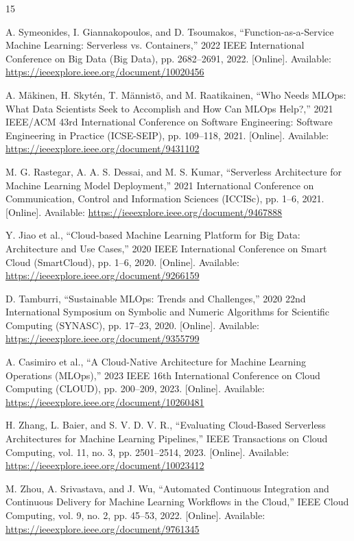 \documentclass[conference]{IEEEtran}
\begin{document}
\begin{thebibliography}{15}

A. Symeonides, I. Giannakopoulos, and D. Tsoumakos, ``Function-as-a-Service Machine Learning: Serverless vs. Containers,'' 2022 IEEE International Conference on Big Data (Big Data), pp. 2682--2691, 2022. [Online]. Available: \url{https://ieeexplore.ieee.org/document/10020456}

A. M\"akinen, H. Skyt\'en, T. M\"annist\"o, and M. Raatikainen, ``Who Needs MLOps: What Data Scientists Seek to Accomplish and How Can MLOps Help?,'' 2021 IEEE/ACM 43rd International Conference on Software Engineering: Software Engineering in Practice (ICSE-SEIP), pp. 109--118, 2021. [Online]. Available: \url{https://ieeexplore.ieee.org/document/9431102}

M. G. Rastegar, A. A. S. Dessai, and M. S. Kumar, ``Serverless Architecture for Machine Learning Model Deployment,'' 2021 International Conference on Communication, Control and Information Sciences (ICCISc), pp. 1--6, 2021. [Online]. Available: \url{https://ieeexplore.ieee.org/document/9467888}

Y. Jiao et al., ``Cloud-based Machine Learning Platform for Big Data: Architecture and Use Cases,'' 2020 IEEE International Conference on Smart Cloud (SmartCloud), pp. 1--6, 2020. [Online]. Available: \url{https://ieeexplore.ieee.org/document/9266159}

D. Tamburri, ``Sustainable MLOps: Trends and Challenges,'' 2020 22nd International Symposium on Symbolic and Numeric Algorithms for Scientific Computing (SYNASC), pp. 17--23, 2020. [Online]. Available: \url{https://ieeexplore.ieee.org/document/9355799}

A. Casimiro et al., ``A Cloud-Native Architecture for Machine Learning Operations (MLOps),'' 2023 IEEE 16th International Conference on Cloud Computing (CLOUD), pp. 200--209, 2023. [Online]. Available: \url{https://ieeexplore.ieee.org/document/10260481}

H. Zhang, L. Baier, and S. V. D. V. R., ``Evaluating Cloud-Based Serverless Architectures for Machine Learning Pipelines,'' IEEE Transactions on Cloud Computing, vol. 11, no. 3, pp. 2501--2514, 2023. [Online]. Available: \url{https://ieeexplore.ieee.org/document/10023412}

M. Zhou, A. Srivastava, and J. Wu, ``Automated Continuous Integration and Continuous Delivery for Machine Learning Workflows in the Cloud,'' IEEE Cloud Computing, vol. 9, no. 2, pp. 45--53, 2022. [Online]. Available: \url{https://ieeexplore.ieee.org/document/9761345}


\end{thebibliography}
\end{document}
